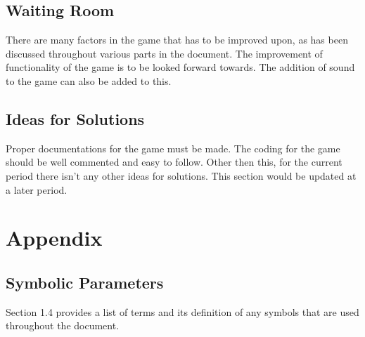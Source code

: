 \documentclass[12pt,letterpaper]{article}
\begin{document}
\subsection{Waiting Room}
There are many factors in the game that has to be improved upon, as has been discussed throughout various parts in the document. The improvement of functionality of the game is to be looked forward towards. The addition of sound to the game can also be added to this.
\subsection{Ideas for Solutions}
Proper documentations for the game must be made. The coding for the game should be well commented and easy to follow. Other then this, for the current period there isn’t any other ideas for solutions. This section would be updated at a later period. 
\section{Appendix}
\subsection{Symbolic Parameters}
Section 1.4 provides a list of terms and its definition of any symbols that are used throughout the document.
\end{document}
